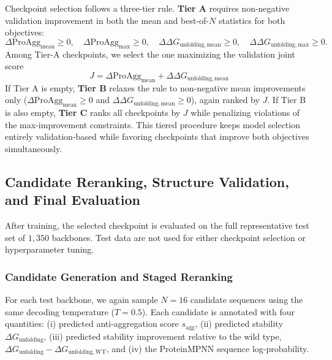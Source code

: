 \documentclass[pdflatex,sn-mathphys-num]{sn-jnl}%
\theoremstyle{thmstyleone}%
\theoremstyle{thmstyletwo}%
\theoremstyle{thmstylethree}%
\begin{document}
Checkpoint selection follows a three-tier rule. \textbf{Tier A} requires non-negative validation improvement in both the mean and best-of-$N$ statistics for both objectives:
\begin{equation}
\Delta \mathrm{ProAgg}_{\mathrm{mean}} \ge 0,\quad
\Delta \mathrm{ProAgg}_{\max} \ge 0,\quad
\Delta \Delta G_{\mathrm{unfolding,mean}} \ge 0,\quad
\Delta \Delta G_{\mathrm{unfolding,max}} \ge 0.
\end{equation}
Among Tier-A checkpoints, we select the one maximizing the validation joint score
\begin{equation}
J = \Delta \mathrm{ProAgg}_{\mathrm{mean}} + \Delta \Delta G_{\mathrm{unfolding,mean}}
\end{equation}
If Tier A is empty, \textbf{Tier B} relaxes the rule to non-negative mean improvements only ($\Delta \mathrm{ProAgg}_{\mathrm{mean}} \ge 0$ and $\Delta \Delta G_{\mathrm{unfolding,mean}} \ge 0$), again ranked by $J$. If Tier B is also empty, \textbf{Tier C} ranks all checkpoints by $J$ while penalizing violations of the max-improvement constraints. This tiered procedure keeps model selection entirely validation-based while favoring checkpoints that improve both objectives simultaneously.

\subsection{Candidate Reranking, Structure Validation, and Final Evaluation}\label{sec:eval}

After training, the selected checkpoint is evaluated on the full representative test set of $1{,}350$ backbones. Test data are not used for either checkpoint selection or hyperparameter tuning.

\subsubsection{Candidate Generation and Staged Reranking}

For each test backbone, we again sample $N=16$ candidate sequences using the same decoding temperature ($T=0.5$). Each candidate is annotated with four quantities: (i) predicted anti-aggregation score $s_{\mathrm{agg}}$, (ii) predicted stability $\Delta G_{\mathrm{unfolding}}$, (iii) predicted stability improvement relative to the wild type, $\Delta G_{\mathrm{unfolding}}-\Delta G_{\mathrm{unfolding,WT}}$, and (iv) the ProteinMPNN sequence log-probability.
\end{document}
